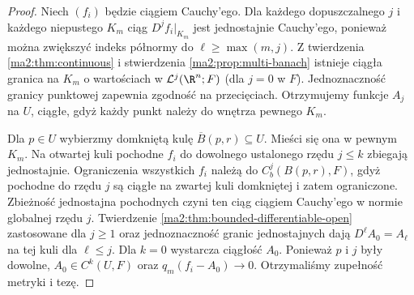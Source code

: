 \begin{proof}
Niech $(f_i)$ będzie ciągiem Cauchy'ego.
Dla każdego dopuszczalnego $j$ i każdego
niepustego $K_m$ ciąg $D^jf_i|_{K_m}$ jest
jednostajnie Cauchy'ego, ponieważ można zwiększyć
indeks półnormy do $\ell\ge\max(m,j)$.
Z twierdzenia \ref{ma2:thm:continuous}
i stwierdzenia \ref{ma2:prop:multi-banach}
istnieje ciągła granica na $K_m$ o wartościach
w $\mathcal L^j(\R^n;F)$ (dla $j=0$ w $F$).
Jednoznaczność granicy punktowej zapewnia zgodność
na przecięciach. Otrzymujemy funkcje $A_j$ na $U$,
ciągłe, gdyż każdy punkt należy do wnętrza pewnego
$K_m$.

Dla $p\in U$ wybierzmy domkniętą kulę
$\overline B(p,r)\subseteq U$. Mieści się ona
w pewnym $K_m$. Na otwartej kuli pochodne
$f_i$ do dowolnego ustalonego rzędu $j\le k$
zbiegają jednostajnie. Ograniczenia wszystkich
$f_i$ należą do $C_b^j(B(p,r),F)$, gdyż
pochodne do rzędu $j$ są ciągłe na zwartej
kuli domkniętej i zatem ograniczone.
Zbieżność jednostajna pochodnych czyni ten
ciąg ciągiem Cauchy'ego w normie globalnej
rzędu $j$. Twierdzenie
\ref{ma2:thm:bounded-differentiable-open}
zastosowane dla $j\ge1$ oraz jednoznaczność
granic jednostajnych dają
$D^\ell A_0=A_\ell$ na tej kuli dla
$\ell\le j$. Dla $k=0$ wystarcza ciągłość $A_0$.
Ponieważ $p$ i $j$ były dowolne,
$A_0\in C^k(U,F)$ oraz $q_m(f_i-A_0)\to0$.
Otrzymaliśmy zupełność metryki i tezę.
\end{proof}

